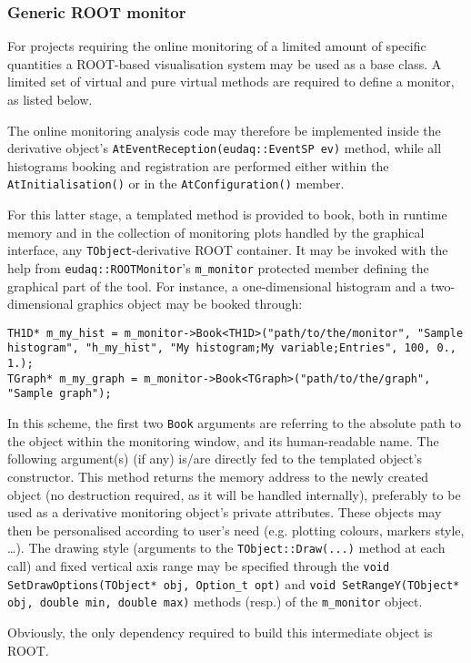\subsubsection{Generic ROOT monitor}
For projects requiring the online monitoring of a limited amount of specific quantities a ROOT-based visualisation system may be used as a base class.
A limited set of virtual and pure virtual methods are required to define a monitor, as listed below.



The online monitoring analysis code may therefore be implemented inside the derivative object's \lstinline[style=cpp]{AtEventReception(eudaq::EventSP ev)} method, while all histograms booking and registration are performed either within the \lstinline[style=cpp]{AtInitialisation()} or in the \lstinline[style=cpp]{AtConfiguration()} member.

For this latter stage, a templated method is provided to book, both in runtime memory and in the collection of monitoring plots handled by the graphical interface, any \lstinline[style=cpp]{TObject}-derivative ROOT container.
It may be invoked with the help from \lstinline[style=cpp]{eudaq::ROOTMonitor}'s \lstinline[style=cpp]{m_monitor} protected member defining the graphical part of the tool.
For instance, a one-dimensional histogram and a two-dimensional graphics object may be booked through:

\begin{lstlisting}[style=cpp]
TH1D* m_my_hist = m_monitor->Book<TH1D>("path/to/the/monitor", "Sample histogram", "h_my_hist", "My histogram;My variable;Entries", 100, 0., 1.);
TGraph* m_my_graph = m_monitor->Book<TGraph>("path/to/the/graph", "Sample graph");
\end{lstlisting}

In this scheme, the first two \lstinline[style=cpp]{Book} arguments are referring to the absolute path to the object within the monitoring window, and its human-readable name. The following argument(s) (if any) is/are directly fed to the templated object's constructor.
This method returns the memory address to the newly created object (no destruction required, as it will be handled internally), preferably to be used as a derivative monitoring object's private attributes.
These objects may then be personalised according to user's need (e.g. plotting colours, markers style, \ldots).
The drawing style (arguments to the \lstinline[style=cpp]{TObject::Draw(...)} method at each call) and fixed vertical axis range may be specified through the \lstinline[style=cpp]{void SetDrawOptions(TObject* obj, Option_t opt)} and \lstinline[style=cpp]{void SetRangeY(TObject* obj, double min, double max)} methods (resp.) of the \lstinline[style=cpp]{m_monitor} object.

Obviously, the only dependency required to build this intermediate object is ROOT.
